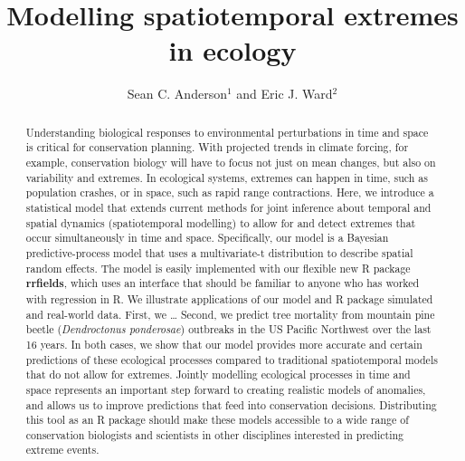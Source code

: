 \documentclass[12pt,english]{article}
\title{Modelling spatiotemporal extremes in ecology}
\author{
Sean C. Anderson$^1$ and
Eric J. Ward$^2$
}
\date{}
\begin{document}
\maketitle

\begin{spacing}{1.05}


\begin{abstract}

Understanding biological responses to environmental perturbations in time and
space is critical for conservation planning. With projected trends in climate
forcing, for example, conservation biology will have to focus not just on mean
changes, but also on variability and extremes. In ecological systems, extremes
can happen in time, such as population crashes, or in space, such as rapid
range contractions. Here, we introduce a statistical model that extends current
methods for joint inference about temporal and spatial dynamics (spatiotemporal
modelling) to allow for and detect extremes that occur simultaneously in time
and space. Specifically, our model is a Bayesian predictive-process model that
uses a multivariate-t distribution to describe spatial random effects. The
model is easily implemented with our flexible new R package \textbf{rrfields},
which uses an interface that should be familiar to anyone who has worked with
regression in R. We illustrate applications of our model and R package simulated and
real-world data. First, we \ldots
Second, we predict tree mortality from mountain pine beetle (\emph{Dendroctonus
  ponderosae}) outbreaks in the US Pacific Northwest over the last 16 years. In
both cases, we show that our model provides more accurate and certain
predictions of these ecological processes compared to traditional
spatiotemporal models that do not allow for extremes. Jointly modelling
ecological processes in time and space represents an important step forward to
creating realistic models of anomalies, and allows us to improve predictions
that feed into conservation decisions. Distributing this tool as an R package
should make these models accessible to a wide range of conservation biologists
and scientists in other disciplines interested in predicting extreme events.
\end{abstract}


\end{spacing}
\end{document}
